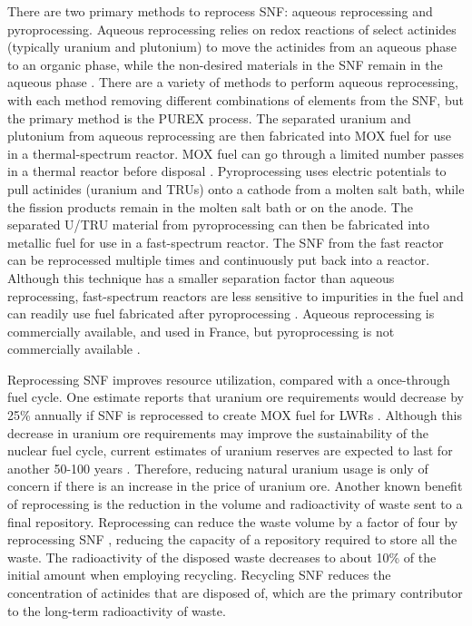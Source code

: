 There are two primary methods to reprocess \gls{SNF}: aqueous reprocessing 
and pyroprocessing. Aqueous reprocessing relies on redox reactions of 
select actinides (typically uranium and plutonium) to move the 
actinides from an aqueous phase to an organic phase, while the non-desired 
materials in the \gls{SNF} remain in the aqueous phase \cite{rodriguez-penalonga_review_2017}. 
There 
are a variety of methods to perform aqueous reprocessing, with each method 
removing different combinations of elements from the \gls{SNF}, but the primary 
method is the PUREX process. The separated uranium and plutonium from 
aqueous reprocessing are then fabricated into \gls{MOX} fuel for use in 
a thermal-spectrum reactor. \gls{MOX} fuel can go through a limited number 
passes in a thermal reactor before disposal \cite{rodriguez-penalonga_review_2017}.
Pyroprocessing uses electric potentials to 
pull actinides (uranium and 
\glspl{TRU}) onto a cathode from a molten salt bath, while the fission products
remain in the molten salt bath or on the anode. The 
separated U/\gls{TRU} material from pyroprocessing can then be fabricated 
into metallic fuel for use in a fast-spectrum reactor. 
The \gls{SNF} from 
the fast reactor can be reprocessed multiple times and continuously put back 
into a reactor. Although this technique 
has a smaller separation factor than aqueous reprocessing, fast-spectrum 
reactors are less sensitive to impurities in the fuel and can readily use 
fuel fabricated after pyroprocessing \cite{rodriguez-penalonga_review_2017}.
Aqueous reprocessing is commercially available, and used in 
France, but pyroprocessing is not commercially available 
\cite{rodriguez-penalonga_review_2017,noauthor_status_2021}. 

Reprocessing \gls{SNF} improves resource utilization, compared 
with a once-through fuel cycle. One estimate reports that uranium ore
requirements would decrease by 25\% annually if \gls{SNF} is reprocessed 
to create \gls{MOX} fuel for \glspl{LWR} \cite{widder_benefits_2010}. 
Although this decrease in uranium ore requirements may improve the 
sustainability of the nuclear fuel cycle, current estimates of uranium 
reserves are expected to last for another 50-100 years 
\cite{widder_benefits_2010}. Therefore, reducing natural uranium usage  
is only of concern 
if there is an increase in the price of uranium ore. Another known benefit 
of reprocessing is the reduction in the volume and radioactivity of 
waste sent to a final repository. Reprocessing can reduce the waste 
volume by 
a factor of four by reprocessing \gls{SNF} \cite{widder_benefits_2010}, 
reducing the capacity of a repository required to store all the 
waste.
The radioactivity of the disposed waste decreases to about 10\% of the 
initial amount \cite{rodriguez-penalonga_review_2017} when employing 
recycling. Recycling \gls{SNF} reduces the concentration of actinides 
that are disposed of, which are the primary contributor to the long-term 
radioactivity of waste. 

